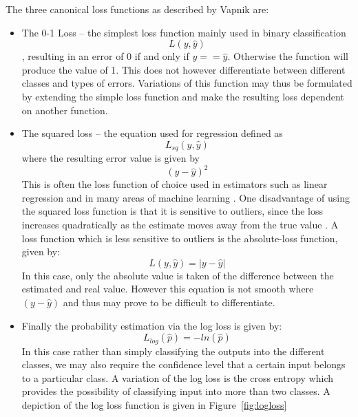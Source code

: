 The three canonical loss functions as described by Vapnik \citep{vapnik1998statistical} are:
\begin{itemize} \item The 0-1 Loss – the simplest loss function mainly used in binary classification \begin{equation} L(y,\hat{y}) \end{equation}, resulting in an error of 0 if and only if $y == \hat{y}$. Otherwise the function will produce the value of 1. This does not however differentiate between different classes and types of errors. Variations of this function may thus be formulated by extending the simple loss function and make the resulting loss dependent on another function.
\item The squared loss – the equation used for regression defined as \begin{equation} L_{sq}(y,\hat{y}) \end{equation}  where the resulting error value is given by \begin{equation} (y-\hat{y})^{2} \end{equation} This is often the loss function of choice used in estimators such as linear regression and in many areas of machine learning \citep {Davidson-Pilon:2015:BMH:2851115}. One disadvantage of using the squared loss function is that it is sensitive to outliers, since the loss increases quadratically as the estimate moves away from the true value \citep {Davidson-Pilon:2015:BMH:2851115}. A loss function which is less sensitive to outliers is the absolute-loss function, given by: \begin{equation} L(y,\hat{y})=|y-\hat{y}|\end{equation} In this case, only the absolute value is taken of the difference between the estimated and real value. However this equation is not smooth where $(y-\hat{y})$ and thus may prove to be difficult to differentiate. 
\item Finally the probability estimation via the log loss is given by: \begin{equation} L_{log}(\hat{p})=-ln(\hat{p}) \end{equation} In this case rather than simply classifying the outputs into the different classes, we may also require the confidence level that a certain input belongs to a particular class. A variation of the log loss is the cross entropy which provides the possibility of classifying input into more than two classes. A depiction of the log loss function is given in Figure~\ref{fig:logloss}
\end{itemize}

